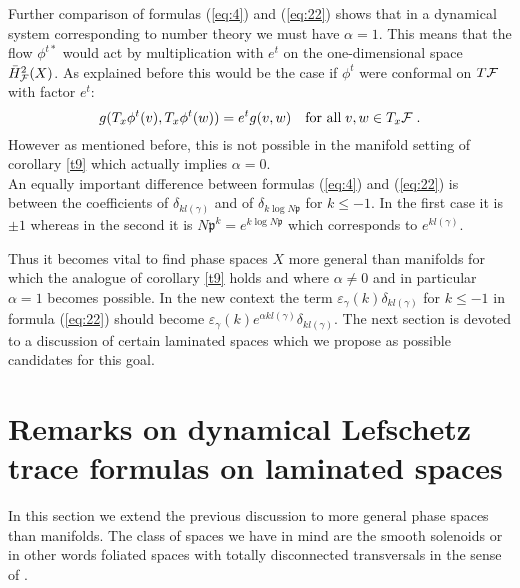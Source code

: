 \documentclass[11pt,leqno]{article}
\newcommand{\Fh}{{\cal F}}
\newcommand{\ep}{\mathfrak{p}}
\newcommand{\oH}{\bar{H}}
\begin{document}
Further comparison of formulas (\ref{eq:4}) and (\ref{eq:22}) shows that in a dynamical system corresponding to number theory we must have $\alpha = 1$. This means that the flow $\phi^{t*}$ would act by multiplication  with $e^t$ on the one-dimensional space $\oH^2_{\Fh} (X)$. As explained before this would be the case if $\phi^t$ were conformal on $T\Fh$ with factor $e^t$:
\begin{equation}
  \label{eq:29}
  g (T_x \phi^t (v) , T_x \phi^t (w)) = e^t g (v,w) \quad \mbox{for all} \; v,w \in T_x \Fh \; .
\end{equation}
However as mentioned before, this is not possible in the manifold setting of corollary \ref{t9} which actually implies $\alpha = 0$. \\
An equally important difference between formulas (\ref{eq:4}) and (\ref{eq:22}) is between the coefficients of $\delta_{kl (\gamma)}$ and of $\delta_{k \log N\ep}$ for $k \le -1$. In the first case it is $\pm 1$ whereas in the second it is $N\ep^k = e^{k \log N \ep}$ which corresponds to $e^{kl (\gamma)}$. 

Thus it becomes vital to find phase spaces $X$ more general than manifolds for which the analogue of corollary \ref{t9} holds and where $\alpha \neq 0$ and in particular $\alpha = 1$ becomes possible. In the new context the term $\varepsilon_{\gamma} (k) \delta_{k l (\gamma)}$ for $k \le -1$ in formula (\ref{eq:22}) should become $\varepsilon_{\gamma} (k) e^{\alpha k l (\gamma)} \delta_{kl (\gamma)}$. The next section is devoted to a discussion of certain laminated spaces which we propose as possible candidates for this goal.
%

\section{Remarks on dynamical Lefschetz trace formulas on laminated spaces}
In this section we extend the previous discussion to more general phase spaces than manifolds. The class of spaces we have in mind are the smooth solenoids \cite{Su} or in other words foliated spaces with totally disconnected transversals in the sense of \cite{MS}. 
\end{document}
